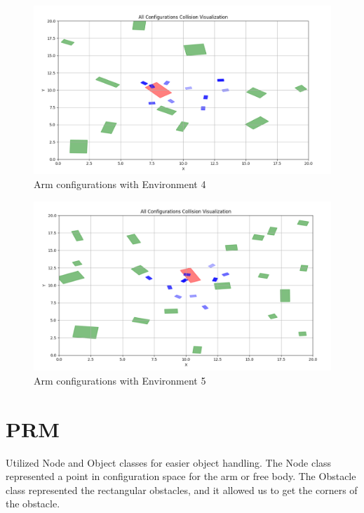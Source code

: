 \documentclass{article}
\begin{document}
\begin{figure} [H]
    \centering
    \includegraphics[width=0.7\linewidth]{latex_media/config_collision_arm_env4.png}
    \caption{Arm configurations with Environment 4}
\end{figure}

\begin{figure} [H]
    \centering
    \includegraphics[width=0.7\linewidth]{latex_media/config_collision_arm_env5.png}
    \caption{Arm configurations with Environment 5}
\end{figure}

\section{PRM}

Utilized Node and Object classes for easier object handling. The Node class represented a point in configuration space for the arm or free body. The Obstacle class represented the rectangular obstacles, and it allowed us to get the corners of the obstacle.
\end{document}
